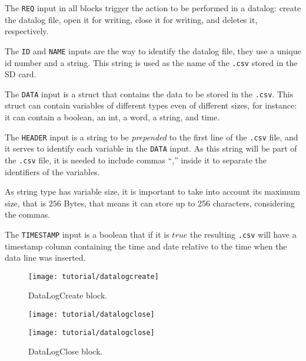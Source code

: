 The \verb|REQ| input in all blocks trigger the action to be performed in a
datalog: create the datalog file,
open it for writing, close it for writing, and deletes it, respectively.

The
\verb|ID| and \verb|NAME| inputs are the way to identify the datalog file, they
use a unique id number and a string. This string is used as the name of the
\verb|.csv| stored in the SD card.

The \verb|DATA| input is a struct that contains the data to be stored in the
\verb|.csv|. This struct can contain variables of different types even of
different sizes, for instance: it can contain a boolean,
an int, a word,
a string, and time.

The \verb|HEADER| input is a string to be \emph{prepended} to the first line of
the \verb|.csv| file, and it serves to identify each variable in the \verb|DATA|
input. As this string will be part of the \verb|.csv| file, it is needed to
include commas ``,'' inside it to separate the identifiers of the variables.

\begin{observation}
  \label{obs:stringSize}
 As string type has variable size, it is important to take into account its
 maximum size, that is $256$ Bytes, that means it can store up to 256 characters,
 considering the commas.
\end{observation}

The \verb|TIMESTAMP| input is a boolean that if it is $true$ the resulting
\verb|.csv| will have a timestamp column containing the time and date relative
to the time when the data line was inserted. 

\begin{figure}[H] \centering
 \texttt{[image: tutorial/datalogcreate]}
  \caption{DataLogCreate block.}
  \label{fig:datalogcreate}
\end{figure}

\begin{figure}[H] \centering
 \texttt{[image: tutorial/datalogclose]}
\caption{}
  \label{fig:datalogopen}
\end{figure}

\begin{figure}[H] \centering
 \texttt{[image: tutorial/datalogclose]}
  \caption{DataLogClose block.}
  \label{fig:datalogclose}
\end{figure}

